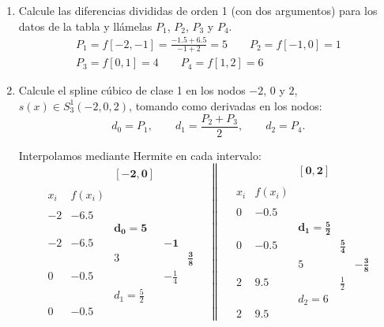 \begin{ejercicio}
\begin{enumerate}
        \item Calcule las diferencias divididas de orden 1 (con dos argumentos) para los datos de la tabla y llámelas $P_1$, $P_2$, $P_3$ y $P_4$.
        \begin{gather*}
            P_1 = f[-2, -1] = \frac{-1.5+6.5}{-1+2} = 5
            \qquad
            P_2 = f[-1, 0] = 1
            \\
            P_3 = f[0,1] = 4
            \qquad
            P_4 = f[1,2] = 6
        \end{gather*}

        \item Calcule el spline cúbico de clase 1 en los nodos $-2$, $0$ y $2$, $s(x)\in S^1_3 (-2, 0, 2)$, tomando como derivadas en los nodos:
        \begin{equation*}
            d_0 = P_1,\qquad d_1=\frac{P_2+P_3}{2}, \qquad d_2=P_4.
        \end{equation*}

        Interpolamos mediante Hermite en cada intervalo:
        \begin{equation*}
            \begin{array}{c|cccc}
                &&\mathbf{[-2, 0]} \\ \\
                x_i & f(x_i) \\ \\
                -2 & \mathbf{-6.5} \\
                && \mathbf{d_0=5}\\
                -2 & -6.5 && \mathbf{-1}\\
                && 3 && \mathbf{\frac{3}{8}}\\ 
                0 & -0.5 && -\frac{1}{4}\\
                && d_1=\frac{5}{2}\\
                0 & -0.5
            \end{array}
            \quad \left\|\quad
            \begin{array}{c|cccc}
                &&\mathbf{[0,2]} \\ \\
                x_i & f(x_i) \\ \\
                0 & \mathbf{-0.5} \\
                && \mathbf{d_1=\frac{5}{2}}\\
                0 & -0.5 && \mathbf{\frac{5}{4}}\\
                && 5 && \mathbf{-\frac{3}{8}}\\ 
                2 & 9.5 && \frac{1}{2}\\
                && d_2=6\\
                2 & 9.5
            \end{array}\right.
        \end{equation*}
    

\end{enumerate}
\end{ejercicio}
